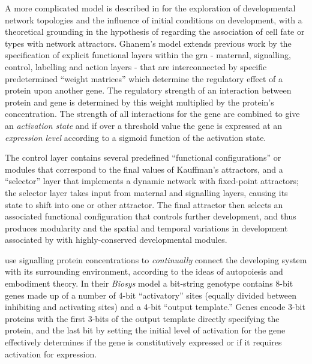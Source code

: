 A more complicated model is described in \cite{Ghanem:2008ct} for the exploration of developmental network
topologies and the influence of initial conditions on development, with a theoretical grounding in the hypothesis of
\cite{Kauffman:1993kk} regarding the association of cell fate or types with network attractors. Ghanem's model extends
previous work by the specification of explicit functional layers within the \gls{grn} - maternal, signalling, control,
labelling and action layers - that are interconnected by specific predetermined ``weight matrices'' which determine the
regulatory effect of a protein upon another gene. The regulatory strength of an interaction between protein and gene is
determined by this weight multiplied by the protein's concentration. The strength of all interactions for the gene are
combined to give an \emph{activation state} and if over a threshold value the gene is expressed at an \emph{expression
	level} according to a sigmoid function of the activation state.

The control layer contains several predefined ``functional configurations'' or modules that correspond to the final
values of Kauffman's attractors, and a ``selector'' layer that implements a dynamic network with fixed-point attractors;
the selector layer takes input from maternal and signalling layers, causing its state to shift into one or other
attractor. The final attractor then selects an associated functional configuration that controls further development,
and thus produces modularity and the spatial and temporal variations in development associated by \cite{Carroll:2005ja}
with highly-conserved developmental modules.

\cite{Quick:2003uq} use signalling protein concentrations to \emph{continually} connect the developing system with its surrounding environment, according to the ideas of autopoiesis \parencite{Varela:1974qd} and embodiment theory. In their \emph{Biosys} model a bit-string genotype contains 8-bit genes made up of a number of 4-bit ``activatory'' sites (equally divided between inhibiting and activating sites) and a 4-bit ``output template.'' Genes encode 3-bit proteins with the first 3-bits of the output template directly specifying the protein, and the last bit by setting the initial level of activation for the gene effectively determines if the gene is \gls{constitutively} expressed or if it requires activation for expression.


